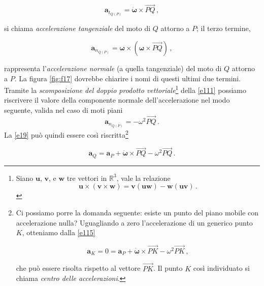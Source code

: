 \begin{equation}
{\bm a}_{\scriptscriptstyle{{t}_{Q(P)}}}=
{\dot{\bm \omega}} \times {{\overrightarrow{PQ}}}\,,
\label{e110}
\end{equation}

\noindent si chiama
{\em accelerazione tangenziale}
del moto di $Q$ attorno a $P$;
il terzo termine,

\begin{equation}
{\bm a}_{\scriptscriptstyle{{n}_{Q(P)}}}=
{\bm \omega}\times({\bm \omega} \times {{\overrightarrow{PQ}}})\,,
\label{e111}
\end{equation}

\noindent  rappresenta l'{\em accelerazione normale}
(a quella tangenziale)
del moto di $Q$ attorno a $P$.
La figura \ref{fig:f17}
dovrebbe chiarire i nomi di questi ultimi due termini.
Tramite la {\em scomposizione del doppio prodotto vettoriale}\footnote{\label{fig:foot110}
Siano ${\bm u}$, ${\bm v}$, e ${\bm w}$ tre 
vettori in $\mathbb{R}^3$, vale la relazione
\begin{equation}
{\bm u}\times({\bm v}\times{\bm w})=
{\bm v}({\bm u}{\bm w})-
{\bm w}({\bm u}{\bm v})\,.
\label{e2f}
\end{equation}
} 
della \ref{e111} possiamo riscrivere il valore della componente 
normale dell'accelerazione nel modo seguente,
valida nel caso di moti piani
\begin{equation}
{\bm a}_{\scriptscriptstyle{{n}_{Q(P)}}}= -\omega^2 {{\overrightarrow{PQ}}}\,.
\label{e112}
\end{equation}
\noindent La \ref{e19} pu\`o quindi essere
cos\`i riscritta\footnote
{
Ci possiamo
porre la domanda seguente: esiste un punto del piano mobile
con accelerazione nulla?
Uguagliando a zero l'accelerazione
di un generico punto $K$, otteniamo
dalla \ref{e115}

\begin{equation}
{{\bm a}_{\scriptscriptstyle{K}}} = 0 =
{{\bm a}_{\scriptscriptstyle{P}}} +
\dot{\bm \omega} \times \overrightarrow{PK}-
\omega^2 {{\overrightarrow{PK}}}\,,
\label{e1f}
\end{equation}

\noindent che pu\`o essere risolta rispetto al vettore $\overrightarrow{PK}$.
Il punto $K$ cos\`i individuato si chiama {\em centro delle accelerazioni}.
}

\begin{equation}
{{\bm a}_{\scriptscriptstyle{Q}}} =
{{\bm a}_{\scriptscriptstyle{P}}} +
\dot{\bm \omega} \times \overrightarrow{PQ}-
\omega^2 {{\overrightarrow{PQ}}}\,.
	\label{e115}
\end{equation}

